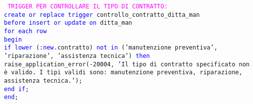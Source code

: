 \documentclass{article}
\begin{document}
    \begin{flushleft}
        \texttt{
        \textcolor{magenta}{TRIGGER PER CONTROLLARE IL TIPO DI CONTRATTO:} \\
        \hspace*{2em} \textcolor{blue}{create or replace trigger} controllo\_contratto\_ditta\_man \\
        \hspace*{2em} \textcolor{blue}{before insert or update on} ditta\_man \\
        \hspace*{2em} \textcolor{blue}{for each row} \\
        \hspace*{2em} \textcolor{blue}{begin} \\
        \hspace*{4.4em}\textcolor{blue}{if lower} (:\textcolor{blue}{new}.contratto) \textcolor{blue}{not in} ('manutenzione preventiva',  \hspace*{4.4em}'riparazione', 'assistenza tecnica') \textcolor{blue}{then} raise\_application\_error(-20004,  \hspace*{4.4em}'Il tipo di contratto specificato non è valido. I tipi validi sono:  \hspace*{4.6em}manutenzione preventiva, riparazione, assistenza tecnica.');\\
        \hspace*{4em} \textcolor{blue}{end if}; \\
        \hspace*{2em} \textcolor{blue}{end}; \\}
    \end{flushleft}
\end{document}

